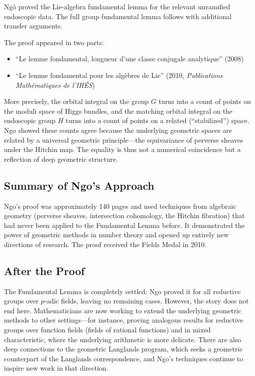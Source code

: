 \begin{theorem}
Ngô proved the Lie-algebra fundamental lemma for the relevant unramified endoscopic data. The full group fundamental lemma follows with additional transfer arguments.
\end{theorem}

The proof appeared in two parts:
\begin{itemize}
\item ``Le lemme fondamental, longueur d'une classe conjugale analytique'' (2008)
\item ``Le lemme fondamental pour les alg\`ebres de Lie'' (2010, \emph{Publications Math\'ematiques de l'IH\'ES})
\end{itemize}

More precisely, the orbital integral on the group $G$ turns into a count of points on the moduli space of Higgs bundles, and the matching orbital integral on the endoscopic group $H$ turns into a count of points on a related (``stabilized'') space. Ngo showed these counts agree because the underlying geometric spaces are related by a universal geometric principle---the equivariance of perverse sheaves under the Hitchin map. The equality is thus not a numerical coincidence but a reflection of deep geometric structure.

\subsection{Summary of Ngo's Approach}

\begin{highlightbox}
Ngo's proof was approximately 140 pages and used techniques from algebraic geometry (perverse sheaves, intersection cohomology, the Hitchin fibration) that had never been applied to the Fundamental Lemma before. It demonstrated the power of geometric methods in number theory and opened up entirely new directions of research. The proof received the Fields Medal in 2010.
\end{highlightbox}

\subsection{After the Proof}

The Fundamental Lemma is completely settled: Ngo proved it for all reductive groups over $p$-adic fields, leaving no remaining cases. However, the story does not end here. Mathematicians are now working to extend the underlying geometric methods to other settings---for instance, proving analogous results for reductive groups over function fields (fields of rational functions) and in mixed characteristic, where the underlying arithmetic is more delicate. There are also deep connections to the geometric Langlands program, which seeks a geometric counterpart of the Langlands correspondence, and Ngo's techniques continue to inspire new work in that direction.


